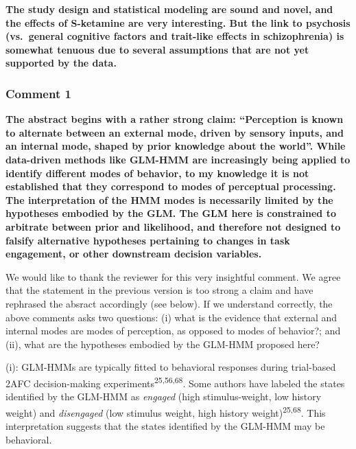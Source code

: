 \documentclass[
]{article}
\begin{document}
\textbf{The study design and statistical modeling are sound and novel,
and the effects of S-ketamine are very interesting. But the link to
psychosis (vs.~general cognitive factors and trait-like effects in
schizophrenia) is somewhat tenuous due to several assumptions that are
not yet supported by the data.}

\subsubsection{Comment 1}\label{comment-1-2}

\textbf{The abstract begins with a rather strong claim: ``Perception is
known to alternate between an external mode, driven by sensory inputs,
and an internal mode, shaped by prior knowledge about the world''. While
data-driven methods like GLM-HMM are increasingly being applied to
identify different modes of behavior, to my knowledge it is not
established that they correspond to modes of perceptual processing. The
interpretation of the HMM modes is necessarily limited by the hypotheses
embodied by the GLM. The GLM here is constrained to arbitrate between
prior and likelihood, and therefore not designed to falsify alternative
hypotheses pertaining to changes in task engagement, or other downstream
decision variables.}

We would like to thank the reviewer for this very insightful comment. We
agree that the statement in the previous version is too strong a claim
and have rephrased the absract accordingly (see below). If we understand
correctly, the above comments asks two questions: (i) what is the
evidence that external and internal modes are modes of perception, as
opposed to modes of behavior?; and (ii), what are the hypotheses
embodied by the GLM-HMM proposed here?

(i): GLM-HMMs are typically fitted to behavioral responses during
trial-based 2AFC decision-making experiments\textsuperscript{25,56,68}.
Some authors have labeled the states identified by the GLM-HMM as
\emph{engaged} (high stimulus-weight, low history weight) and
\emph{disengaged} (low stimulus weight, high history
weight)\textsuperscript{25,68}. This interpretation suggests that the
states identified by the GLM-HMM may be behavioral.
\end{document}
